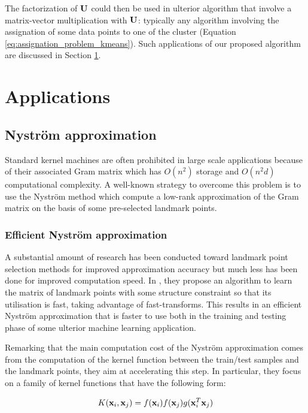 \documentclass{article}
\begin{document}
The factorization of ${\mathbf{U}}$ could then be used in ulterior algorithm that involve a matrix-vector multiplication with ${\mathbf{U}}$: typically any algorithm involving the assignation of some data points to one of the cluster (Equation \ref{eq:assignation_problem_kmeans}). Such applications of our proposed algorithm are discussed in Section \ref{sec:uses}.

\section{Applications}
\label{sec:uses}

\subsection{Nyström approximation}

Standard kernel machines are often prohibited in large scale applications because of their associated Gram matrix which has $O(n^2)$ storage and $O(n^2d)$ computational complexity. A well-known strategy to overcome this problem is to use the Nyström method which compute a low-rank approximation of the Gram matrix on the basis of some pre-selected landmark points. 

\subsubsection{Efficient Nyström approximation}

A substantial amount of research has been conducted toward landmark point selection methods for improved approximation accuracy \cite{kumar2012sampling} \cite{musco2017recursive} but much less has been done for improved computation speed. In \cite{si2016computationally}, they propose an algorithm to learn the matrix of landmark points with some structure constraint so that its utilisation is fast, taking advantage of fast-transforms. This results in an efficient Nyström approximation that is faster to use both in the training and testing phase of some ulterior machine learning application.

Remarking that the main computation cost of the Nyström approximation comes from the computation of the kernel function between the train/test samples and the landmark points, they aim at accelerating this step. In particular, they focus on a family of kernel functions that have the following form:

\begin{equation}
 K({\mathbf{x}}_i, {\mathbf{x}}_j) = f({\mathbf{x}}_i) f({\mathbf{x}}_j) g({\mathbf{x}}_i^T{\mathbf{x}}_j)
\end{equation}
\end{document}
